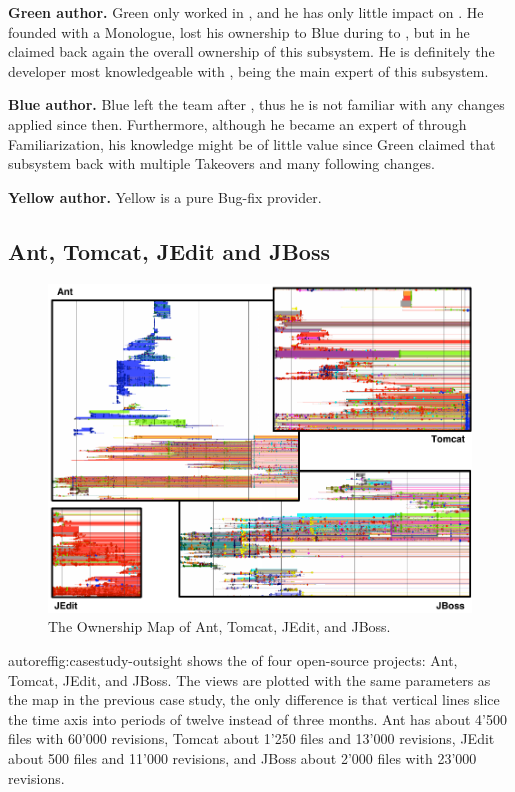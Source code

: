 \textbf{Green author.} Green only worked in , and he has only little impact on . He founded  with a Monologue, lost his ownership to Blue during  to , but in  he claimed back again the overall ownership of this subsystem. He is definitely the developer most knowledgeable with , being the main expert of this subsystem.

\textbf{Blue author.} Blue left the team after , thus he is not familiar with any changes applied since then. Furthermore, although he became an expert of  through Familiarization, his knowledge might be of little value since Green claimed that subsystem back with multiple Takeovers and many following changes.

\textbf{Yellow author.} Yellow is a pure Bug-fix provider.

\subsection{Ant, Tomcat, JEdit and JBoss}

\begin{figure}[htb]
\begin{center}
\includegraphics[width=12.5cm]{fig/casestudies-overview.pdf}
\caption{The Ownership Map of Ant, Tomcat, JEdit, and JBoss.}
\label{fig:casestudies-owerview}
\end{center}
\end{figure}

autoref{fig:casestudy-outsight} shows the \omap of four open-source projects: Ant, Tomcat, JEdit, and JBoss. The views are plotted with the same parameters as the map in the previous case study, the only difference is that vertical lines slice the time axis into periods of twelve instead of three months. Ant has about 4'500 files with 60'000 revisions, Tomcat about 1'250 files and 13'000 revisions, JEdit about 500 files and 11'000 revisions, and JBoss about 2'000 files with 23'000 revisions.

